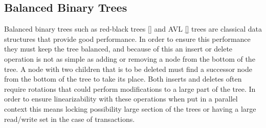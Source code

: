 \documentclass[10pt]{sigplanconf}
\begin{document}
%
%
%
%
%
%



\subsection*{Balanced Binary Trees}
Balanced binary trees such as red-black trees \ref{} and AVL \ref{} trees are classical data structures that provide good performance.
In order to ensure this performance they must keep the tree balanced, and because of this an insert or delete operation is not as simple as adding or removing a node from the bottom of the tree.
A node with two children that is to be deleted must find a successor node from the bottom of the tree to take its place.
Both inserts and deletes often require rotations that could perform modifications to a large part of the tree.
In order to ensure linearizability with these operations when put in a parallel context this means locking possibility large section of the trees or having a large read/write set in the case of transactions.
\end{document}
